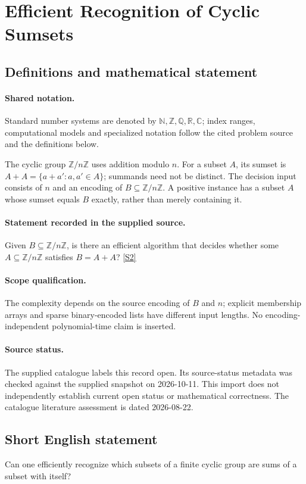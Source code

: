 \documentclass[11pt]{article}
\newcommand{\sref}[2]{\hyperlink{source:#1:#2}{[S#2]}}
\begin{document}
\section{Efficient Recognition of Cyclic Sumsets}\label{statement}

\subsection{Definitions and mathematical statement}

\paragraph{Shared notation.}Standard number systems are denoted by $\mathbb N,\mathbb Z,\mathbb Q,\mathbb R,\mathbb C$; index ranges, computational models and specialized notation follow the cited problem source and the definitions below.


The cyclic group $\mathbb Z/n\mathbb Z$ uses addition modulo $n$. For a subset $A$, its sumset is $A+A=\{a+a':a,a'\in A\}$; summands need not be distinct. The decision input consists of $n$ and an encoding of $B\subseteq\mathbb Z/n\mathbb Z$. A positive instance has a subset $A$ whose sumset equals $B$ exactly, rather than merely containing it.
\paragraph{Statement recorded in the supplied source.}
Given $B\subseteq\mathbb Z/n\mathbb Z$, is there an efficient algorithm that decides whether some $A\subseteq\mathbb Z/n\mathbb Z$ satisfies $B=A+A$? \sref{statement}{2}
\paragraph{Scope qualification.}
The complexity depends on the source encoding of $B$ and $n$; explicit membership arrays and sparse binary-encoded lists have different input lengths. No encoding-independent polynomial-time claim is inserted.
\paragraph{Source status.}
The supplied catalogue labels this record open. Its source-status metadata was checked against the supplied snapshot on 2026-10-11. This import does not independently establish current open status or mathematical correctness. The catalogue literature assessment is dated 2026-08-22.
\subsection{Short English statement}
Can one efficiently recognize which subsets of a finite cyclic group are sums of a subset with itself?
\end{document}
